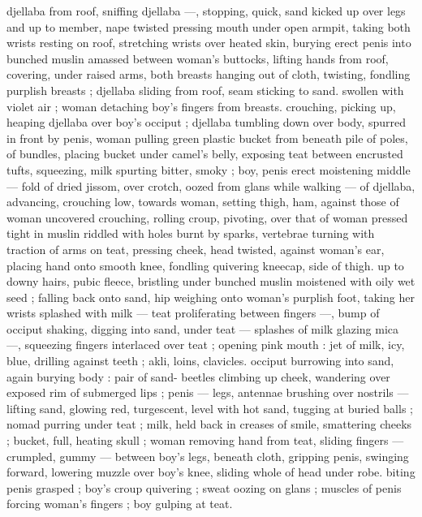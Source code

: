 djellaba from roof, sniffing djellaba ---, stopping, quick, sand kicked 
up over legs and up to member, nape twisted pressing mouth under 
open armpit, taking both wrists resting on roof, stretching wrists over 
heated skin, burying erect penis into bunched muslin amassed 
between woman's buttocks, lifting hands from roof, covering, under 
raised arms, both breasts hanging out of cloth, twisting, fondling 
purplish breasts ; djellaba sliding from roof, seam sticking to sand. 
swollen with violet air ; woman detaching boy's fingers from breasts. 
crouching, picking up, heaping djellaba over boy's occiput ; djellaba 
tumbling down over body, spurred in front by penis, woman pulling 
green plastic bucket from beneath pile of poles, of bundles, placing 
bucket under camel's belly, exposing teat between encrusted tufts, 
squeezing, milk spurting bitter, smoky ; boy, penis erect moistening 
middle --- fold of dried jissom, over crotch, oozed from glans while 
walking --- of djellaba, advancing, crouching low, towards woman, 
setting thigh, ham, against those of woman uncovered crouching, 
rolling croup, pivoting, over that of woman pressed tight in muslin 
riddled with holes burnt by sparks, vertebrae turning with traction of 
arms on teat, pressing cheek, head twisted, against woman's ear, 
placing hand onto smooth knee, fondling quivering kneecap, side of 
thigh. up to downy hairs, pubic fleece, bristling under bunched 
muslin moistened with oily wet seed ; falling back onto sand, hip 
weighing onto woman's purplish foot, taking her wrists splashed with 
milk --- teat proliferating between fingers ---, bump of occiput 
shaking, digging into sand, under teat --- splashes of milk glazing 
mica ---, squeezing fingers interlaced over teat ; opening pink mouth 
: jet of milk, icy, blue, drilling against teeth ; akli, loins, clavicles. 
occiput burrowing into sand, again burying body : pair of sand- 
beetles climbing up cheek, wandering over exposed rim of 
submerged lips ; penis --- legs, antennae brushing over nostrils --- 
lifting sand, glowing red, turgescent, level with hot sand, tugging at 
buried balls ; nomad purring under teat ; milk, held back in creases 
of smile, smattering cheeks ; bucket, full, heating skull ; woman 
removing hand from teat, sliding fingers --- crumpled, gummy --- 
between boy's legs, beneath cloth, gripping penis, swinging forward, 
lowering muzzle over boy's knee, sliding whole of head under robe. 
biting penis grasped ; boy's croup quivering ; sweat oozing on glans 
; muscles of penis forcing woman's fingers ; boy gulping at teat. 
